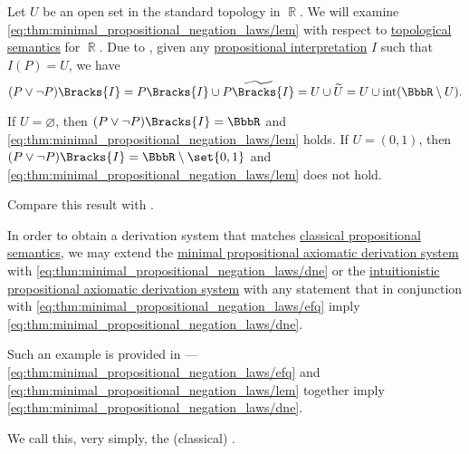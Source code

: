 \begin{example}\label{ex:topological_semantics_lem_counterexample}
  Let \( U \) be an open set in the standard topology in \( \BbbR \). We will examine \eqref{eq:thm:minimal_propositional_negation_laws/lem} with respect to \hyperref[def:propositional_topological_semantics]{topological semantics} for \( \BbbR \). Due to , given any \hyperref[def:propositional_semantics/interpretation]{propositional interpretation} \( I \) such that \( I(P) = U \), we have
  \begin{equation*}
    (P \vee \neg P)\Bracks{I}
    =
    P\Bracks{I} \cup \widetilde{P\Bracks{I}}
    =
    U \cup \widetilde{U}
    =
    U \cup \inter(\BbbR \setminus U).
  \end{equation*}

  If \( U = \varnothing \), then \( (P \vee \neg P)\Bracks{I} = \BbbR \) and \eqref{eq:thm:minimal_propositional_negation_laws/lem} holds. If \( U = (0, 1) \), then \( (P \vee \neg P)\Bracks{I} = \BbbR \setminus \set{ 0, 1 } \) and \eqref{eq:thm:minimal_propositional_negation_laws/lem} does not hold.

  Compare this result with .
\end{example}

\begin{definition}\label{def:propositional_axiomatic_derivation_system}
  In order to obtain a derivation system that matches \hyperref[def:propositional_semantics]{classical propositional semantics}, we may extend the \hyperref[def:minimal_propositional_axiomatic_derivation_system]{minimal propositional axiomatic derivation system} with \eqref{eq:thm:minimal_propositional_negation_laws/dne} or the \hyperref[def:intuitionistic_propositional_axiomatic_derivation_system]{intuitionistic propositional axiomatic derivation system} with any statement that in conjunction with \eqref{eq:thm:minimal_propositional_negation_laws/efq} imply \eqref{eq:thm:minimal_propositional_negation_laws/dne}.

  Such an example is provided in  --- \eqref{eq:thm:minimal_propositional_negation_laws/efq} and \eqref{eq:thm:minimal_propositional_negation_laws/lem} together imply \eqref{eq:thm:minimal_propositional_negation_laws/dne}.

  We call this, very simply, the (classical) .
\end{definition}


